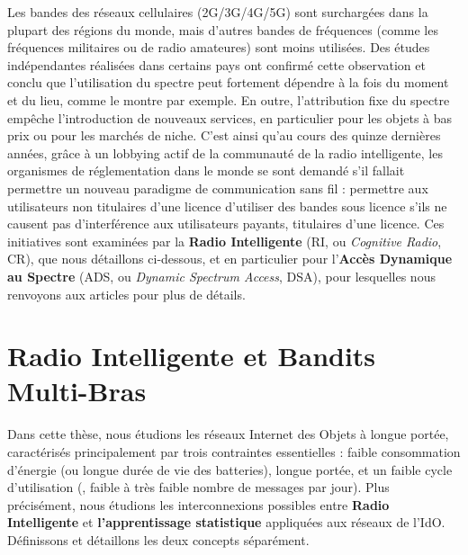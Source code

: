 \begin{resume_fr}
Les bandes des réseaux cellulaires (2G/3G/4G/5G) sont surchargées dans la plupart des régions du monde, mais d'autres bandes de fréquences (comme les fréquences militaires ou de radio amateures) sont moins utilisées.
Des études indépendantes réalisées dans certains pays ont confirmé cette observation et conclu que l'utilisation du spectre peut fortement dépendre à la fois du moment et du lieu, comme le montre \cite{Lopez2009spectral} par exemple.
En outre, l'attribution fixe du spectre empêche
l'introduction de nouveaux services, en particulier pour les objets à bas prix ou pour les marchés de niche.
%
C'est ainsi qu'au cours des quinze dernières années, grâce à un lobbying actif de la communauté de la radio intelligente,
les organismes de réglementation dans le monde se sont demandé s'il fallait permettre un nouveau paradigme de communication sans fil :
permettre aux utilisateurs non titulaires d'une licence d'utiliser des bandes sous licence s'ils ne causent pas d'interférence aux utilisateurs payants, titulaires d'une licence.
Ces initiatives sont examinées par la \textbf{Radio Intelligente} (RI, ou \emph{Cognitive Radio}, CR),
que nous détaillons ci-dessous, et en particulier pour l'\textbf{Accès Dynamique au Spectre} (ADS, ou \emph{Dynamic Spectrum Access}, DSA),
pour lesquelles nous renvoyons aux articles \cite{akyildiz2006next,garhwal2012survey} pour plus de détails.



\section*{Radio Intelligente et Bandits Multi-Bras}

Dans cette thèse, nous étudions les réseaux Internet des Objets à longue portée, caractérisés principalement par trois contraintes essentielles :
faible consommation d'énergie (ou longue durée de vie des batteries),
longue portée,
et un faible cycle d'utilisation (\ie, faible à très faible nombre de messages par jour).
%
Plus précisément, nous étudions les interconnexions possibles entre \textbf{Radio Intelligente} et \textbf{l'apprentissage statistique} appliquées aux réseaux de l'IdO.
Définissons et détaillons les deux concepts séparément.



\end{resume_fr}
